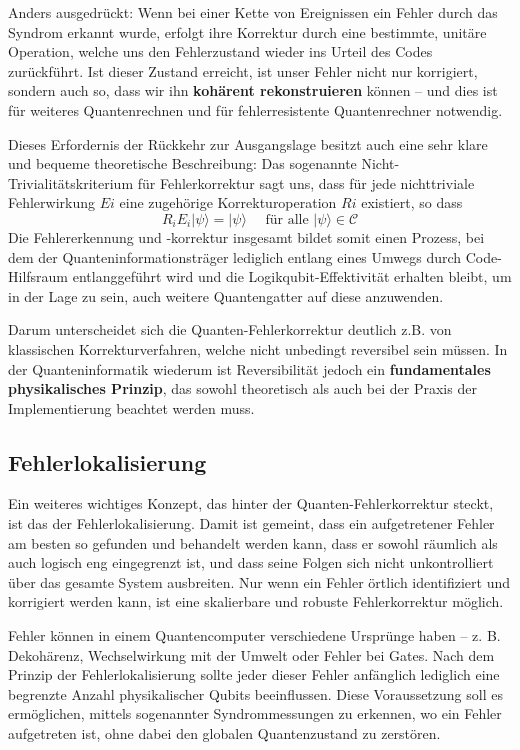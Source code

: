 Anders ausgedrückt: Wenn bei einer Kette von Ereignissen ein Fehler durch das Syndrom erkannt wurde, erfolgt ihre Korrektur durch eine bestimmte, unitäre Operation, welche uns den Fehlerzustand wieder ins Urteil des Codes zurückführt. Ist dieser Zustand erreicht, ist unser Fehler nicht nur korrigiert, sondern auch so, dass wir ihn\textbf{ kohärent rekonstruieren} können – und dies ist für weiteres Quantenrechnen und für fehlerresistente Quantenrechner notwendig.

Dieses Erfordernis der Rückkehr zur Ausgangslage besitzt auch eine sehr klare und bequeme theoretische Beschreibung: Das sogenannte Nicht-Trivialitätskriterium für Fehlerkorrektur sagt uns, dass für jede nichttriviale Fehlerwirkung \(E 
i
​\) eine zugehörige Korrekturoperation \(R 
i\) existiert, so dass 
\begin{equation}
    R_{i} E_{i}|\psi\rangle=|\psi\rangle \quad \text { für alle }|\psi\rangle \in \mathcal{C}
\end{equation}
Die Fehlererkennung und -korrektur insgesamt bildet somit einen Prozess, bei dem der Quanteninformationsträger lediglich entlang eines Umwegs durch Code-Hilfsraum entlanggeführt wird und die Logikqubit-Effektivität erhalten bleibt, um in der Lage zu sein, auch weitere Quantengatter auf diese anzuwenden.

Darum unterscheidet sich die Quanten-Fehlerkorrektur deutlich z.B. von klassischen Korrekturverfahren, welche nicht unbedingt reversibel sein müssen. In der Quanteninformatik wiederum ist Reversibilität jedoch ein \textbf{fundamentales physikalisches Prinzip}, das sowohl theoretisch als auch bei der Praxis der Implementierung beachtet werden muss.

\subsection{Fehlerlokalisierung}
Ein weiteres wichtiges Konzept, das hinter der Quanten-Fehlerkorrektur steckt, ist das der Fehlerlokalisierung. Damit ist gemeint, dass ein aufgetretener Fehler am besten so gefunden und behandelt werden kann, dass er sowohl räumlich als auch logisch eng eingegrenzt ist, und dass seine Folgen sich nicht unkontrolliert über das gesamte System ausbreiten. Nur wenn ein Fehler örtlich identifiziert und korrigiert werden kann, ist eine skalierbare und robuste Fehlerkorrektur möglich. \cite[Seite 451-452]{nielsen_michael_a_and_isaac_l_chuang_quantum_2010}

Fehler können in einem Quantencomputer verschiedene Ursprünge haben – z. B. Dekohärenz, Wechselwirkung mit der Umwelt oder Fehler bei Gates. Nach dem Prinzip der Fehlerlokalisierung sollte jeder dieser Fehler anfänglich lediglich eine begrenzte Anzahl physikalischer Qubits beeinflussen. Diese Voraussetzung soll es ermöglichen, mittels sogenannter Syndrommessungen zu erkennen, wo ein Fehler aufgetreten ist, ohne dabei den globalen Quantenzustand zu zerstören.


